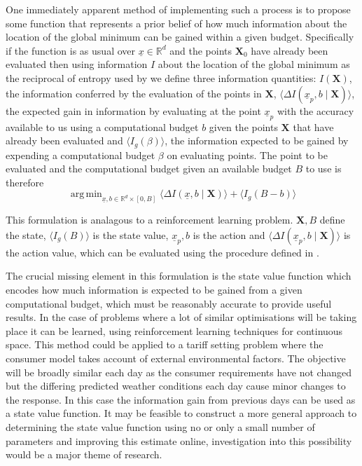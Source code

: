 \documentclass[a4paper, 10 pt, conference]{ieeeconf}  %
\DeclareMathOperator*{\argmin}{arg\,min}
\begin{document}
One immediately apparent method of implementing such a process is to propose some function that represents a prior belief of how much information about the location of the global minimum can be gained within a given budget. Specifically if the function is as usual over $\underline{x} \in \mathbb{R}^{d}$ and the points $\mathbf{X}_{0}$ have already been evaluated then using information $I$ about the location of the global minimum as the reciprocal of entropy used by \cite{hennig2012entropy} we define three information quantities:
$I(\mathbf{X})$,
the information conferred by the evaluation of the points in $\mathbf{X}$,
$\langle\Delta I(\underline{x}_{p},b \mid \mathbf{X})\rangle$,
the expected gain in information by evaluating at the point $\underline{x}_{p}$ with the accuracy available to us using a computational budget $b$ given the points $\mathbf{X}$ that have already been evaluated and
$\langle I_{g}(\beta)\rangle$,
the information expected to be gained by expending a computational budget $\beta$ on evaluating points.
The point to be evaluated and the computational budget given an available budget $B$ to use is therefore
\begin{equation}
\argmin_{\underline{x},b \in \mathbb{R}^{d} \times [0,B]} \langle\Delta I(\underline{x},b \mid \mathbf{X})\rangle + \langle I_{g}(B-b)\rangle
\end{equation}

This formulation is analagous to a reinforcement learning problem. $\mathbf{X},B$ define the state, $\langle I_{g}(B)\rangle$ is the state value, $\underline{x}_{p},b$ is the action and $\langle\Delta I(\underline{x}_{p},b \mid \mathbf{X})\rangle$ is the action value, which can be evaluated using the procedure defined in \cite{hennig2012entropy}.

The crucial missing element in this formulation is the state value function which encodes how much information is expected to be gained from a given computational budget, which must be reasonably accurate to provide useful results. In the case of problems where a lot of similar optimisations will be taking place it can be learned, using reinforcement learning techniques for continuous space. This method could be applied to a tariff setting problem where the consumer model takes account of external environmental factors. The objective will be broadly similar each day as the consumer requirements have not changed but the differing predicted weather conditions each day cause minor changes to the response. In this case the information gain from previous days can be used as a state value function. It may be feasible to construct a more general approach to determining the state value function using no or only a small number of parameters and improving this estimate online, investigation into this possibility would be a major theme of research.
\end{document}
